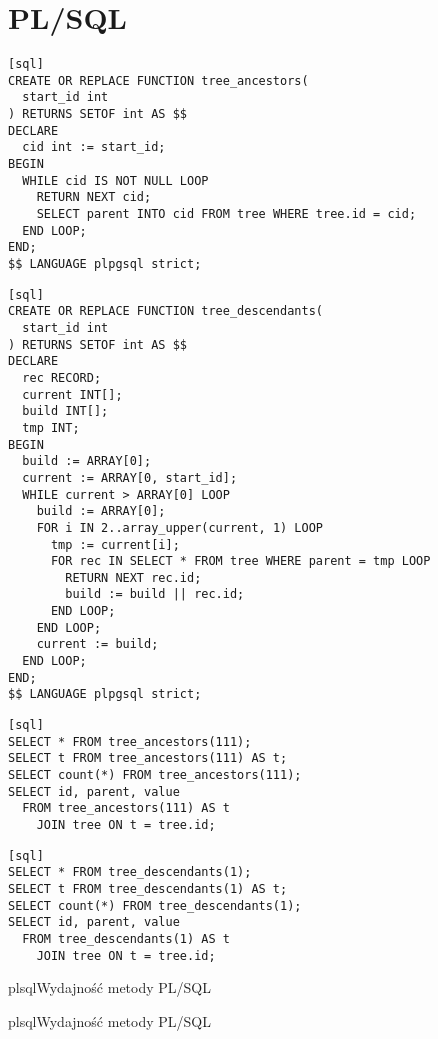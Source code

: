 \section{PL/SQL}






\begin{verbatim}[sql]
CREATE OR REPLACE FUNCTION tree_ancestors(
  start_id int
) RETURNS SETOF int AS $$
DECLARE
  cid int := start_id;
BEGIN
  WHILE cid IS NOT NULL LOOP
    RETURN NEXT cid;
    SELECT parent INTO cid FROM tree WHERE tree.id = cid;
  END LOOP;
END;
$$ LANGUAGE plpgsql strict;
\end{verbatim}

\begin{verbatim}[sql]
CREATE OR REPLACE FUNCTION tree_descendants(
  start_id int
) RETURNS SETOF int AS $$ 
DECLARE
  rec RECORD;
  current INT[];
  build INT[];
  tmp INT;
BEGIN
  build := ARRAY[0];
  current := ARRAY[0, start_id];
  WHILE current > ARRAY[0] LOOP
    build := ARRAY[0];  
    FOR i IN 2..array_upper(current, 1) LOOP
      tmp := current[i];  
      FOR rec IN SELECT * FROM tree WHERE parent = tmp LOOP
        RETURN NEXT rec.id;
        build := build || rec.id;
      END LOOP;
    END LOOP;
    current := build;
  END LOOP;
END;
$$ LANGUAGE plpgsql strict;
\end{verbatim}



\begin{verbatim}[sql]
SELECT * FROM tree_ancestors(111);
SELECT t FROM tree_ancestors(111) AS t;
SELECT count(*) FROM tree_ancestors(111);
SELECT id, parent, value
  FROM tree_ancestors(111) AS t
    JOIN tree ON t = tree.id;
\end{verbatim}



\begin{verbatim}[sql]
SELECT * FROM tree_descendants(1);
SELECT t FROM tree_descendants(1) AS t;
SELECT count(*) FROM tree_descendants(1);
SELECT id, parent, value
  FROM tree_descendants(1) AS t 
    JOIN tree ON t = tree.id;
\end{verbatim}



\begin{qxtab}{plsql}{Wydajność metody PL/SQL}
\end{qxtab}

\begin{qxfig}{plsql}{Wydajność metody PL/SQL}
\end{qxfig}








